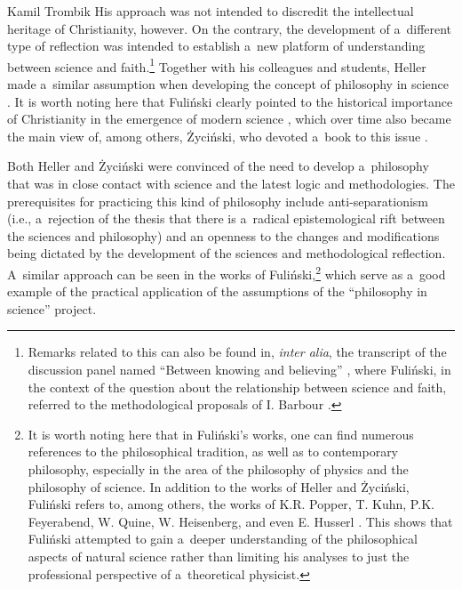 \begin{artengenv}{Kamil Trombik}
His approach was not intended to discredit the intellectual heritage of Christianity, however. On the contrary, the development of a~different type of reflection was intended to establish a~new platform of understanding between science and faith.\footnote{Remarks related to this can also be found in, \textit{inter alia}, the transcript of the discussion panel named ``Between knowing and believing'' 
\parencite[][]{heller_watpliwosci_1990}, %
 where Fuliński, in the context of the question about the relationship between science and faith, referred to the methodological proposals of I. Barbour 
\parencite[][]{fulinski_glos_1991}.%
} Together with his colleagues and students, Heller made a~similar assumption when developing the concept of philosophy in science 
\parencites[e.g][]{polak_science-religion_2021}[][]{PolakRodzen2023}[][]{polak_krakow_2022}. %
 It is worth noting here that Fuliński clearly pointed to the historical importance of Christianity in the emergence of modern science 
\parencite[][]{janik_fizyka_1981}, %
 which over time also became the main view of, among others, Życiński, who devoted a~book to this issue 
\parencite[][]{zycinski_inspiracje_2000}.%




Both Heller and Życiński were convinced of the need to develop a~philosophy that was in close contact with science and the latest logic and methodologies. The prerequisites for practicing this kind of philosophy include anti-separationism (i.e., a~rejection of the thesis that there is a~radical epistemological rift between the sciences and philosophy) and an openness to the changes and modifications being dictated by the development of the sciences and methodological reflection. A~similar approach can be seen in the works of Fuliński,\footnote{It is worth noting here that in Fuliński's works, one can find numerous references to the philosophical tradition, as well as to contemporary philosophy, especially in the area of the philosophy of physics and the philosophy of science. In addition to the works of Heller and Życiński, Fuliński refers to, among others, the works of K.R. Popper, T. Kuhn, P.K. Feyerabend, W. Quine, W. Heisenberg, and even E. Husserl 
\parencite[see][]{wszolek_o_1996}. %
 This shows that Fuliński attempted to gain a~deeper understanding of the philosophical aspects of natural science rather than limiting his analyses to just the professional perspective of a~theoretical physicist.} which serve as a~good example of the practical application of the assumptions of the ``philosophy in science'' project.




\end{artengenv}
